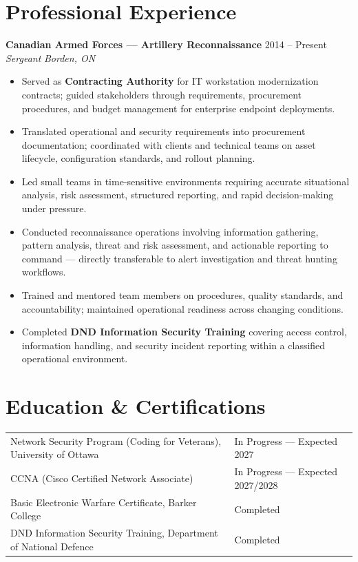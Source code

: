 \documentclass[10pt,letterpaper]{article}
\newcommand{\resumeSubheading}[4]{%
  \textbf{#1} \hfill #4 \\
  \textit{#2} \hfill \textit{#3} \vspace{2pt}
}
\begin{document}
\section{Professional Experience}

\resumeSubheading{Canadian Armed Forces --- Artillery Reconnaissance}{Sergeant}{Borden, ON}{2014 -- Present}
\begin{itemize}
  \item Served as \textbf{Contracting Authority} for IT workstation modernization contracts; guided stakeholders through requirements, procurement procedures, and budget management for enterprise endpoint deployments.
  \item Translated operational and security requirements into procurement documentation; coordinated with clients and technical teams on asset lifecycle, configuration standards, and rollout planning.
  \item Led small teams in time-sensitive environments requiring accurate situational analysis, risk assessment, structured reporting, and rapid decision-making under pressure.
  \item Conducted reconnaissance operations involving information gathering, pattern analysis, threat and risk assessment, and actionable reporting to command --- directly transferable to alert investigation and threat hunting workflows.
  \item Trained and mentored team members on procedures, quality standards, and accountability; maintained operational readiness across changing conditions.
  \item Completed \textbf{DND Information Security Training} covering access control, information handling, and security incident reporting within a classified operational environment.
\end{itemize}

\section{Education \& Certifications}
\renewcommand{\arraystretch}{1.15}
\begin{tabularx}{\textwidth}{@{}>{\raggedright\arraybackslash}X >{\raggedleft\arraybackslash}p{2.1in}@{}}
  Network Security Program (Coding for Veterans), University of Ottawa & In Progress --- Expected 2027 \\
  CCNA (Cisco Certified Network Associate) & In Progress --- Expected 2027/2028 \\
  Basic Electronic Warfare Certificate, Barker College & Completed \\
  DND Information Security Training, Department of National Defence & Completed \\
\end{tabularx}
\end{document}
